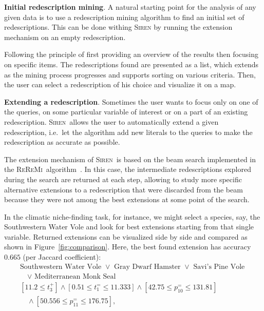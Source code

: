 \documentclass{llncs}
\newcommand{\prg}[1]{\textbf{#1}.}
\newcommand{\Siren}{\textsc{Siren}}
\newcommand{\ReReMi}{\textsc{ReReMi}}
\begin{document}

\prg{Initial redescription mining} A natural starting point for the
analysis of any given data is to use a redescription mining algorithm
to find an initial set of redescriptions.  This can be done withing
\Siren{} by running the extension mechanism on an empty redescription.

Following the principle of first providing an overview of the
results then focusing on specific items.
The redescriptions found are presented as a list, which extends as the
mining process progresses and supports sorting on various criteria.
Then, the user can select a redescription of his choice and visualize
it on a map.

\prg{Extending a redescription} Sometimes the user wants to focus only
on one of the queries, on some particular variable of interest or on a
part of an existing redescription.  \Siren\ allows the user to
automatically extend a given redescription, i.e.\ let the algorithm
add new literals to the queries to make the redescription as accurate
as possible.

The extension mechanism of \Siren\ is based on the beam search
implemented in the \ReReMi\ algorithm~\cite{galbrun11black}. In this case, the intermediate redescriptions
explored during the search are returned at each step, allowing to study
more specific alternative extensions to a redescription that were discarded from the beam
because they were not among the best extensions at some point of the search.

In the climatic niche-finding task, for instance, we might select a
species, say, the Southwestern Water Vole and look for best extensions
starting from that single variable.  Returned extensions can be
visualized side by side and compared as shown in
Figure~\ref{fig:comparison}. Here, the best found extension has
accuracy $0.665$ (per Jaccard coefficient):
\begin{equation*}
\begin{array}{l}
\text{Southwestern Water Vole }\lor\text{ Gray Dwarf Hamster }\lor\text{ Savi's Pine Vole }\\[1mm]
\quad\lor\text{ Mediterranean Monk Seal}\\[3mm]
[11.2 \leq t_{3}^{+}] \land  [0.51 \leq t_{1}^{=} \leq 11.333]\land  [42.75 \leq p_{10}^{=} \leq 131.81] \\[1mm]
\quad\land [50.556 \leq p_{11}^{=} \leq 176.75],
\end{array}
\end{equation*}
\end{document}
